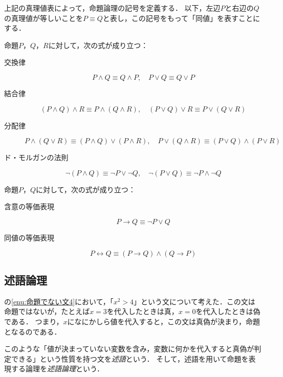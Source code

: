 上記の真理値表によって，命題論理の記号を定義する．
以下，左辺$P$と右辺の$Q$の真理値が等しいことを$P \equiv Q$と表し，この記号をもって「同値」を表すことにする．

\begin{prop}{}{}
  命題$P$，$Q$，$R$に対して，次の式が成り立つ：
  \begin{description}
    \item[交換律] 
    \[
      P \land Q \equiv Q \land P,\quad P \lor Q \equiv Q \lor P
    \]
    \item[結合律] 
    \[
      (P \land Q) \land R \equiv P \land (Q \land R),\quad (P \lor Q) \lor R \equiv P \lor (Q \lor R)
    \]
    \item[分配律] 
    \[
      P \land (Q \lor R) \equiv (P \land Q) \lor (P \land R), \quad P \lor (Q \land R) \equiv (P \lor Q) \land (P \lor R)
    \]
    \item[ド・モルガンの法則]
    \[
      \lnot (P \land Q) \equiv \lnot P \lor \lnot Q, \quad \lnot (P \lor Q) \equiv \lnot P \land \lnot Q
    \]
  \end{description}
\end{prop}

\begin{prop}{}{}
  命題$P$，$Q$に対して，次の式が成り立つ：
  \begin{description}
    \item[含意の等価表現]
    \[
      P \to Q \equiv \lnot P \lor Q
    \]
    \item[同値の等価表現]
    \[
      P \leftrightarrow Q \equiv (P \to Q) \land (Q \to P)
    \]
\end{description}
\end{prop}


\subsection{述語論理}

の\ref{enu:命題でない文4}において，「$x^2 >4$」という文について考えた．この文は命題ではないが，たとえば$x=3$を代入したときは真，$x=0$を代入したときは偽である．
つまり，$x$になにかしら値を代入すると，この文は真偽が決まり，命題となるのである．

このような「値が決まっていない変数を含み，変数に何かを代入すると真偽が判定できる」という性質を持つ文を\emph{述語}という．
そして，述語を用いて命題を表現する論理を\emph{述語論理}という．


